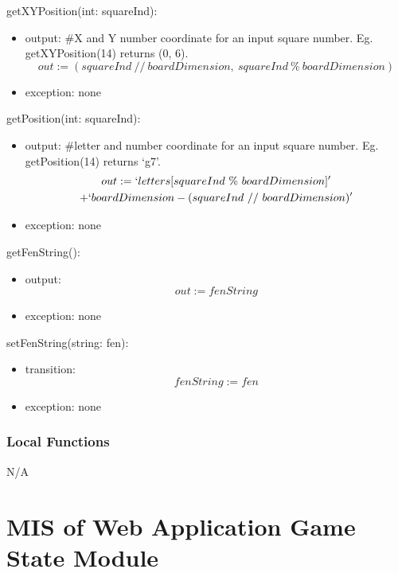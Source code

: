 \documentclass[12pt, titlepage]{article}
\begin{document}
        \noindent getXYPosition(int: squareInd):
        \begin{itemize}
            \item output: \#X and Y number coordinate for an input square number. 
                Eg. getXYPosition(14) returns (0, 6). \\
                \[out := (squareInd\ //\ boardDimension,\ squareInd\ \%\ boardDimension)\]
            \item exception: none
        \end{itemize}

        \noindent getPosition(int: squareInd):
        \begin{itemize}
            \item output: \#letter and number coordinate for an input square number.
                Eg. getPosition(14) returns `g7'. \\
                \begin{multline}
                    out := `letters[squareInd\ \%\ boardDimension]' \notag\\ 
                    + `boardDimension - (squareInd\ //\ boardDimension)'
                \end{multline}
                
            \item exception: none
        \end{itemize}

        \noindent getFenString():
        \begin{itemize}
            \item output: \[out := fenString\]
            \item exception: none
        \end{itemize}

        \noindent setFenString(string: fen):
        \begin{itemize}
            \item transition: \[fenString := fen\]
            \item exception: none
        \end{itemize}

    \subsubsection{Local Functions}
    N/A

    \newpage

\section{MIS of Web Application Game State Module} \label{mGame}
\end{document}
